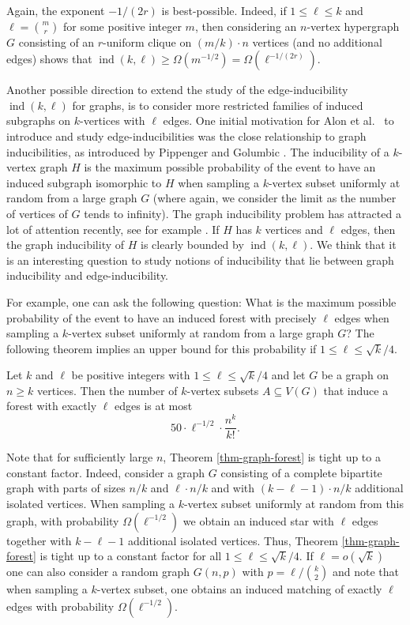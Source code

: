 Again, the exponent $-1/(2r)$ is best-possible. Indeed, if $1\leq \ell\leq k$ and $\ell={m\choose r}$ for some positive integer $m$, then considering an $n$-vertex hypergraph $G$ consisting of an $r$-uniform clique on $(m/k)\cdot n$ vertices (and no additional edges) shows that $\operatorname{ind}(k,\ell)\geq \Omega(m^{-1/2})=\Omega(\ell^{-1/(2r)})$.

Another possible direction to extend the study of the edge-inducibility $\operatorname{ind}(k,\ell)$ for graphs, is to consider more restricted families of induced subgraphs on $k$-vertices with $\ell$ edges. One initial motivation for Alon et al.\ \cite{alon-et-al} to introduce and study edge-inducibilities was the close relationship to graph inducibilities, as introduced by Pippenger and Golumbic \cite{pippenger-golumbic}. The inducibility of a $k$-vertex graph $H$ is the maximum possible probability of the event to have an induced subgraph isomorphic to $H$ when sampling a $k$-vertex subset uniformly at random from a large graph $G$ (where again, we consider the limit as the number of vertices of $G$ tends to infinity). The graph inducibility problem has attracted a lot of attention recently, see for example \cite{balogh-hu-lidicky-pfender, hefetz-tyomkyn, kral-norin-volec, yuster}. If $H$ has $k$ vertices and $\ell$ edges, then the graph inducibility of $H$ is clearly bounded by $\operatorname{ind}(k,\ell)$. We think that it is an interesting question to study notions of inducibility that lie between graph inducibility and edge-inducibility.

For example, one can ask the following question: What is the maximum possible probability of the event to have an induced forest with precisely $\ell$ edges when sampling a $k$-vertex subset uniformly at random from a large graph $G$? The following theorem implies an upper bound for this probability if $1\leq \ell\leq \sqrt{k}/4$.

\begin{theorem}\label{thm-graph-forest}Let $k$ and $\ell$ be positive integers with $1\leq \ell\leq \sqrt{k}/4$ and let $G$ be a graph on $n \geq k$ vertices. Then the number of $k$-vertex subsets $A\subseteq V(G)$ that induce a forest with exactly $\ell$ edges is at most
\[50\cdot \ell^{-1/2}\cdot \frac{n^k}{k!}.\]
\end{theorem}

Note that for sufficiently large $n$, Theorem \ref{thm-graph-forest} is tight up to a constant factor. Indeed, consider a graph $G$ consisting of a complete bipartite graph with parts of sizes $n/k$ and $\ell\cdot n/k$ and with $(k-\ell-1)\cdot n/k$ additional isolated vertices. When sampling a $k$-vertex subset uniformly at random from this graph, with probability $\Omega(\ell^{-1/2})$ we obtain an induced star with $\ell$ edges together with $k-\ell-1$ additional isolated vertices. Thus, Theorem \ref{thm-graph-forest} is tight up to a constant factor for all $1\leq \ell\leq \sqrt{k}/4$. If $\ell=o(\sqrt{k})$ one can also consider a random graph $G(n,p)$ with $p=\ell/{k \choose 2}$ and note that when sampling a $k$-vertex subset, one obtains an induced matching of exactly $\ell$ edges with probability $\Omega(\ell^{-1/2})$.  

